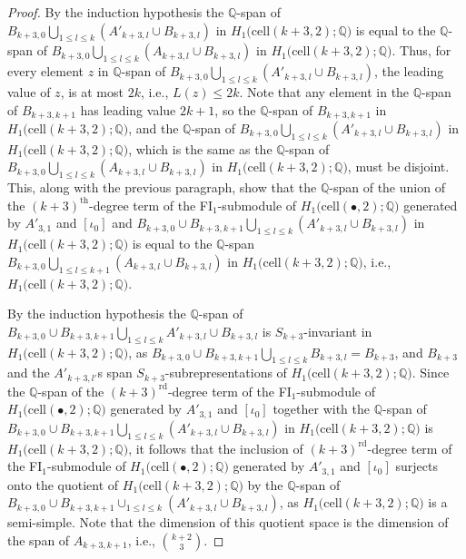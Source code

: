 \documentclass[12py]{amsart}%
\theoremstyle{definition}\newtheorem{definition}[thm]{Definition}
\theoremstyle{definition}
\newcommand{\Q}{\ensuremath{\mathbb{Q}}}
\begin{document}
\begin{proof}
By the induction hypothesis the $\Q$-span of $B_{k+3,0}\bigcup_{1\le l\le k}(A'_{k+3,l}\cup B_{k+3,l})$ in $H_{1}\big(\text{cell}(k+3, 2);\Q\big)$ is equal to the $\Q$-span of $B_{k+3,0}\bigcup_{1\le l\le k}(A_{k+3,l}\cup B_{k+3,l})$ in $H_{1}\big(\text{cell}(k+3, 2);\Q\big)$. Thus, for every element $z$ in $\Q$-span of $B_{k+3,0}\bigcup_{1\le l\le k}(A'_{k+3,l}\cup B_{k+3,l})$, the leading value of $z$, is at most $2k$, i.e., $L(z)\le 2k$. Note that any element in the $\Q$-span of $B_{k+3,k+1}$ has leading value $2k+1$, so the $\Q$-span of $B_{k+3,k+1}$ in $H_{1}\big(\text{cell}(k+3, 2);\Q\big)$, and the $\Q$-span of $B_{k+3,0}\bigcup_{1\le l\le k}(A'_{k+3,l}\cup B_{k+3,l})$ in $H_{1}\big(\text{cell}(k+3, 2);\Q\big)$, which is the same as the $\Q$-span of $B_{k+3,0}\bigcup_{1\le l\le k}(A_{k+3,l}\cup B_{k+3,l})$ in $H_{1}\big(\text{cell}(k+3, 2);\Q\big)$, must be disjoint. This, along with the previous paragraph, show that the $\Q$-span of the union of the $(k+3)^{\text{th}}$-degree term of the FI$_{1}$-submodule of $H_{1}\big(\text{cell}(\bullet, 2);\Q\big)$ generated by $A'_{3,1}$ and $[\iota_{0}]$ and $B_{k+3,0}\cup B_{k+3,k+1}\bigcup_{1\le l\le k}(A'_{k+3,l}\cup B_{k+3,l})$ in $H_{1}\big(\text{cell}(k+3, 2);\Q\big)$ is equal to the $\Q$-span $B_{k+3,0}\bigcup_{1\le l\le k+1}(A_{k+3,l}\cup B_{k+3,l})$ in $H_{1}\big(\text{cell}(k+3, 2);\Q\big)$, i.e., $H_{1}\big(\text{cell}(k+3,2);\Q\big)$.

By the induction hypothesis the $\Q$-span of $B_{k+3,0}\cup B_{k+3,k+1}\bigcup_{1\le l\le k}A'_{k+3,l}\cup B_{k+3,l}$ is $S_{k+3}$-invariant in $H_{1}\big(\text{cell}(k+3, 2);\Q\big)$, as $B_{k+3,0}\cup B_{k+3,k+1}\bigcup_{1\le l\le k}B_{k+3,l}=B_{k+3}$, and $B_{k+3}$ and the $A'_{k+3,l'}$s span $S_{k+3}$-subrepresentations of $H_{1}\big(\text{cell}(k+3, 2);\Q\big)$. Since the $\Q$-span of the $(k+3)^{\text{rd}}$-degree term of the FI$_{1}$-submodule of $H_{1}\big(\text{cell}(\bullet, 2);\Q\big)$ generated by $A'_{3,1}$ and $[\iota_{0}]$ together with the $\Q$-span of $B_{k+3,0}\cup B_{k+3,k+1}\bigcup_{1\le l\le k}(A'_{k+3,l}\cup B_{k+3,l})$ in $H_{1}\big(\text{cell}(k+3, 2);\Q\big)$ is $H_{1}(\text{cell}(k+3,2);\Q\big)$, it follows that the inclusion of $(k+3)^{\text{rd}}$-degree term of the FI$_{1}$-submodule of $H_{1}\big(\text{cell}(\bullet, 2);\Q\big)$ generated by $A'_{3,1}$ and $[\iota_{0}]$ surjects onto the quotient of $H_{1}\big(\text{cell}(k+3,2);\Q\big)$ by the $\Q$-span of $B_{k+3,0}\cup B_{k+3,k+1}\cup_{1\le l\le k}(A'_{k+3,l}\cup B_{k+3,l})$, as $H_{1}\big(\text{cell}(k+3,2);\Q\big)$ is a semi-simple. Note that the dimension of this quotient space is the dimension of the span of $A_{k+3,k+1}$, i.e., $\binom{k+2}{3}$. 


\end{proof}
\end{document}

